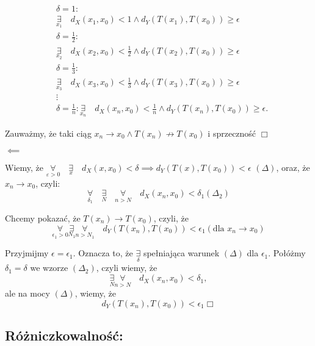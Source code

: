 \documentclass[../main.tex]{subfiles}
\begin{document}
\begin{align*}
    &\delta=1:\\
    &\underset{x_1}{\exists} \quad d_{X} (x_{1},x_{0})<1 \land d_{Y} (T(x_{1}), T(x_{0})) \geq \epsilon \\
    &\delta=\frac{1}{2}:\\
    &\underset{x_2}{\exists} \quad d_{X} (x_{2},x_{0})<\frac{1}{2} \land d_{Y} (T(x_{2}), T(x_{0})) \geq \epsilon \\
    &\delta=\frac{1}{3}:\\
    &\underset{x_3}{\exists} \quad d_{X} (x_{3},x_{0})<\frac{1}{3} \land d_{Y} (T(x_{3}), T(x_{0})) \geq \epsilon\\
    &\vdots\\
    &\delta=\frac{1}{n}: \underset{x_n}{\exists} \quad d_{X}(x_{n},x_{0}) < \frac{1}{n} \land d_{Y} (T(x_{n}),T(x_{0})) \geq \epsilon
.\end{align*}

Zauważmy, że taki ciąg $x_{n} \to x_{0} \land T(x_{n}) \not\rightarrow T(x_{0})$ i sprzeczność $\Box$

\vspace{0.5cm}
\begin{large}
    $\impliedby$
\end{large}
\vspace{0.5cm}
Wiemy, że $\underset{\varepsilon > 0}{\forall}\quad \underset{x}{\exists}\quad d_{X} (x,x_{0}) < \delta \implies d_{Y} (T(x),T(x_{0})) < \epsilon$ $(\Delta)$, oraz, że $x_{n} \to x_{0}$, czyli:
\[
    \underset{\delta_1}{\forall} \quad\underset{N}{\exists} \quad\underset{n>N}{\forall} \quad d_{X} (x_{n}, x_{0}) < \delta_{1} (\Delta_2)
\]

Chcemy pokazać, że $T(x_n) \to T(x_0)$, czyli, że
$$\underset{\epsilon_1 > 0}{\forall} \underset{N_1}{\exists} \underset{n>N_1}{\forall} \quad d_Y (T(x_n),T(x_0)) < \epsilon_1 (\text{dla } x_n \to x_0)$$

Przyjmijmy $\epsilon=\epsilon_1$. Oznacza to, że $\underset{\delta}{\exists}$ spełniająca warunek $(\Delta)$ dla $\epsilon_1$. Połóżmy $\delta_1=\delta$ we wzorze $(\Delta_2)$, czyli wiemy, że
$$\underset{N}{\exists} \underset{n>N}{\forall} \quad d_X(x_n, x_0) < \delta_1,$$
ale na mocy $(\Delta)$, wiemy, że
$$d_Y (T(x_n),T(x_0)) < \epsilon_1 \Box$$

\subsection{
    Różniczkowalność:
}
\end{document}
